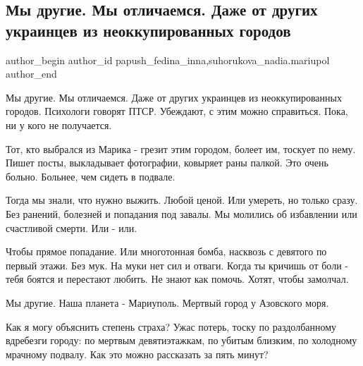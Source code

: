  
 
 
 
 
 
\subsection{Мы другие. Мы отличаемся. Даже от других украинцев из неоккупированных городов }
\label{sec:24_05_2022.fb.papush_fedina_inna.1.my_drugie}
 
\ifcmt
 author_begin
   author_id papush_fedina_inna,suhorukova_nadia.mariupol
 author_end
\fi

Мы другие. Мы отличаемся. Даже от других украинцев из неоккупированных городов.
Психологи говорят ПТСР. Убеждают,  с этим можно справиться. Пока, ни у кого не
получается. 

Тот, кто выбрался из Марика - грезит этим городом, болеет им, тоскует по
нему. Пишет посты, выкладывает фотографии, ковыряет раны палкой. Это очень
больно. Больнее, чем сидеть в подвале. 


Тогда мы знали, что нужно выжить. Любой ценой. Или умереть, но только сразу.
Без ранений, болезней и попадания под завалы. Мы молились об избавлении или
счастливой смерти. Или - или. 

Чтобы прямое попадание. Или многотонная бомба, насквозь с девятого по первый
этажи.  Без мук. На муки нет сил и отваги. Когда ты кричишь от боли -  тебя
боятся и перестают любить. Не знают как помочь. Хотят, чтобы замолчал.


Мы другие. Наша планета -  Мариуполь. Мертвый город у Азовского моря.

Как я могу объяснить степень страха?  Ужас потерь, тоску по раздолбанному
вдребезги городу: по  мертвым девятиэтажкам, по убитым  близким, по холодному
мрачному подвалу. Как это можно рассказать за пять минут?

